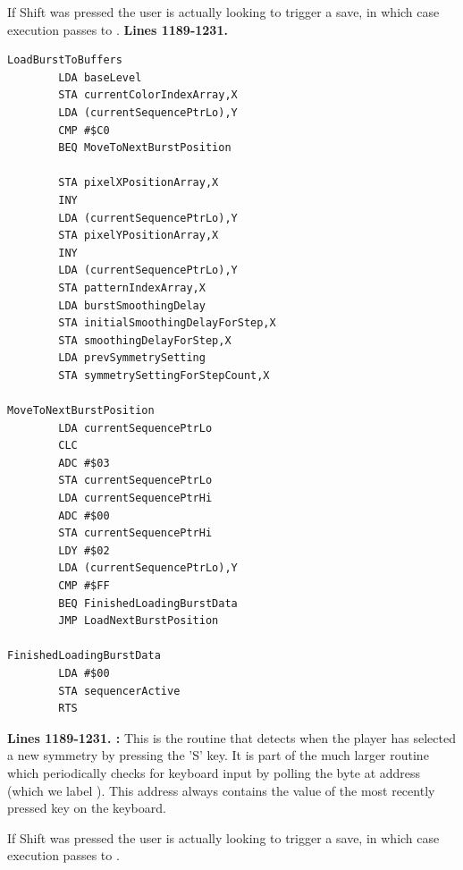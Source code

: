 If Shift was pressed the user is actually looking to trigger a save, in which case execution passes to .
\clearpage
\textbf{Lines 1189-1231. }
\begin{lstlisting}
LoadBurstToBuffers
        LDA baseLevel
        STA currentColorIndexArray,X
        LDA (currentSequencePtrLo),Y
        CMP #$C0
        BEQ MoveToNextBurstPosition

        STA pixelXPositionArray,X
        INY 
        LDA (currentSequencePtrLo),Y
        STA pixelYPositionArray,X
        INY 
        LDA (currentSequencePtrLo),Y
        STA patternIndexArray,X
        LDA burstSmoothingDelay
        STA initialSmoothingDelayForStep,X
        STA smoothingDelayForStep,X
        LDA prevSymmetrySetting
        STA symmetrySettingForStepCount,X

MoveToNextBurstPosition
        LDA currentSequencePtrLo
        CLC 
        ADC #$03
        STA currentSequencePtrLo
        LDA currentSequencePtrHi
        ADC #$00
        STA currentSequencePtrHi
        LDY #$02
        LDA (currentSequencePtrLo),Y
        CMP #$FF
        BEQ FinishedLoadingBurstData
        JMP LoadNextBurstPosition

FinishedLoadingBurstData
        LDA #$00
        STA sequencerActive
        RTS 
\end{lstlisting}
\clearpage

\textbf{Lines 1189-1231. :} This is the routine that detects when the player has selected a new
symmetry by pressing the 'S' key. It is part of the much larger routine  which periodically checks
for keyboard input by polling the byte at address  (which we label ). This address always
contains the value of the most recently pressed key on the keyboard.

If Shift was pressed the user is actually looking to trigger a save, in which case execution passes to .
\clearpage
